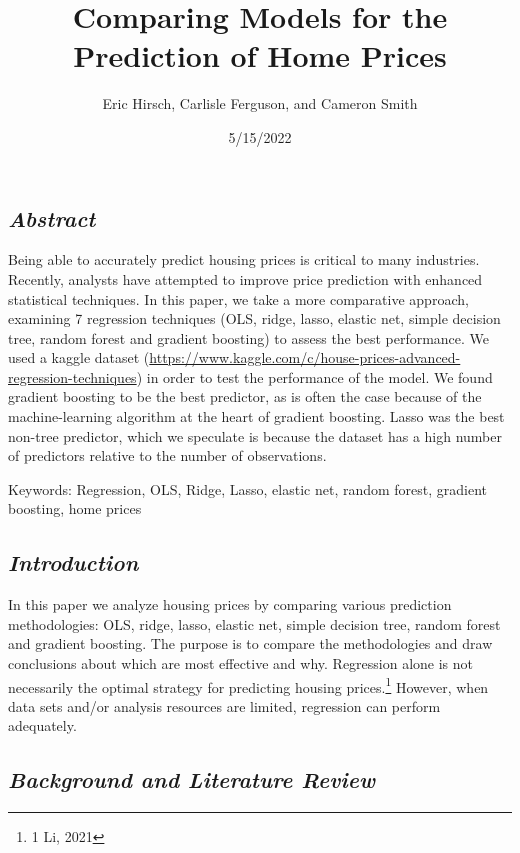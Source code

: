 \documentclass[
]{article}
\title{Comparing Models for the Prediction of Home Prices}
\author{Eric Hirsch, Carlisle Ferguson, and Cameron Smith}
\date{5/15/2022}
\begin{document}
\maketitle

{
\setcounter{tocdepth}{4}
\tableofcontents
}
\hypertarget{abstract}{%
\subsection{\texorpdfstring{\emph{Abstract}}{Abstract}}\label{abstract}}

Being able to accurately predict housing prices is critical to many
industries. Recently, analysts have attempted to improve price
prediction with enhanced statistical techniques. In this paper, we take
a more comparative approach, examining 7 regression techniques (OLS,
ridge, lasso, elastic net, simple decision tree, random forest and
gradient boosting) to assess the best performance. We used a kaggle
dataset
(\url{https://www.kaggle.com/c/house-prices-advanced-regression-techniques})
in order to test the performance of the model. We found gradient
boosting to be the best predictor, as is often the case because of the
machine-learning algorithm at the heart of gradient boosting. Lasso was
the best non-tree predictor, which we speculate is because the dataset
has a high number of predictors relative to the number of observations.

Keywords: Regression, OLS, Ridge, Lasso, elastic net, random forest,
gradient boosting, home prices

\hypertarget{introduction}{%
\subsection{\texorpdfstring{\emph{Introduction}}{Introduction}}\label{introduction}}

In this paper we analyze housing prices by comparing various prediction
methodologies: OLS, ridge, lasso, elastic net, simple decision tree,
random forest and gradient boosting. The purpose is to compare the
methodologies and draw conclusions about which are most effective and
why. Regression alone is not necessarily the optimal strategy for
predicting housing prices.\footnote{1 Li, 2021} However, when data sets
and/or analysis resources are limited, regression can perform
adequately.

\hypertarget{background-and-literature-review}{%
\subsection{\texorpdfstring{\emph{Background and Literature
Review}}{Background and Literature Review}}\label{background-and-literature-review}}
\end{document}
